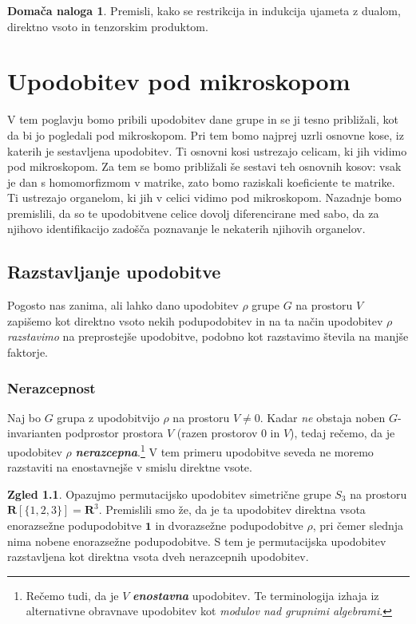 \documentclass[11pt]{book}
\def\RR{\mathbf{R}}
\def\11{\mathbf{1}}
\def\definicija{\color{rdeca}\bf\em}
\theoremstyle{definition}
\theoremstyle{zgled}
\newtheorem*{zgled}{Zgled}
\theoremstyle{odprtproblem}
\theoremstyle{domacanaloga}
\newtheorem*{domacanaloga}{Domača naloga}
\theoremstyle{izrek}
\begin{document}
\begin{domacanaloga}
    Premisli, kako se restrikcija in indukcija ujameta z dualom, direktno vsoto in tenzorskim produktom.
\end{domacanaloga}

\chapter{Upodobitev pod mikroskopom}

V tem poglavju bomo pribili upodobitev dane grupe in se ji tesno približali, kot da bi jo pogledali pod mikroskopom. Pri tem bomo najprej uzrli osnovne kose, iz katerih je sestavljena upodobitev. Ti osnovni kosi ustrezajo celicam, ki jih vidimo pod mikroskopom. Za tem se bomo približali še sestavi teh osnovnih kosov: vsak je dan s homomorfizmom v matrike, zato bomo raziskali koeficiente te matrike. Ti ustrezajo organelom, ki jih v celici vidimo pod mikroskopom. Nazadnje bomo premislili, da so te upodobitvene celice dovolj diferencirane med sabo, da za njihovo identifikacijo zadošča poznavanje le nekaterih njihovih organelov.

\section{Razstavljanje upodobitve}

Pogosto nas zanima, ali lahko dano upodobitev $\rho$ grupe $G$ na prostoru $V$ zapišemo kot direktno vsoto nekih podupodobitev in na ta način upodobitev $\rho$ \emph{razstavimo} na preprostejše upodobitve, podobno kot razstavimo števila na manjše faktorje. 

\subsection{Nerazcepnost}

Naj bo $G$ grupa z upodobitvijo $\rho$ na prostoru $V \neq 0$. Kadar \emph{ne} obstaja noben $G$-invarianten podprostor prostora $V$ (razen prostorov $0$ in $V$), tedaj rečemo, da je upodobitev $\rho$ {\definicija nerazcepna}.\footnote{Rečemo tudi, da je $V$ {\definicija enostavna} upodobitev. Te terminologija izhaja iz alternativne obravnave upodobitev kot \emph{modulov nad grupnimi algebrami}.} V tem primeru upodobitve seveda ne moremo razstaviti na enostavnejše v smislu direktne vsote.

\begin{zgled}
Opazujmo permutacijsko upodobitev simetrične grupe $S_3$ na prostoru $\RR[\{ 1,2,3 \}] = \RR^3$. Premislili smo že, da je ta upodobitev direktna vsota enorazsežne podupodobitve $\11$ in dvorazsežne podupodobitve $\rho$, pri čemer slednja nima nobene enorazsežne podupodobitve. S tem je permutacijska upodobitev razstavljena kot direktna vsota dveh nerazcepnih upodobitev.
\end{zgled}
\end{document}
